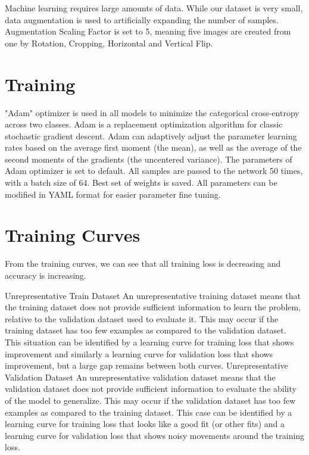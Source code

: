 Machine learning requires large amounts of data. While our dataset is very small, data augmentation is used to artificially expanding the number of samples. Augmentation Scaling Factor is set to 5, meaning five images are created from one by Rotation, Cropping, Horizontal and Vertical Flip.

\section{Training}
"Adam" optimizer is used in all models to minimize the categorical cross-entropy across two classes. Adam is a replacement optimization algorithm for classic stochastic gradient descent. Adam can adaptively adjust the parameter learning rates based on the average first moment (the mean), as well as the average of the second moments of the gradients (the uncentered variance). The parameters of Adam optimizer is set to default. All samples are passed to the network 50 times, with a batch size of 64. Best set of weights is saved. All parameters can be modified in YAML format for easier parameter fine tuning.


\section{Training Curves}

From the training curves, we can see that all training loss is decreasing and accuracy is increasing.

Unrepresentative Train Dataset
An unrepresentative training dataset means that the training dataset does not provide sufficient information to learn the problem, relative to the validation dataset used to evaluate it.
This may occur if the training dataset has too few examples as compared to the validation dataset.
This situation can be identified by a learning curve for training loss that shows improvement and similarly a learning curve for validation loss that shows improvement, but a large gap remains between both curves.
Unrepresentative Validation Dataset
An unrepresentative validation dataset means that the validation dataset does not provide sufficient information to evaluate the ability of the model to generalize.
This may occur if the validation dataset has too few examples as compared to the training dataset.
This case can be identified by a learning curve for training loss that looks like a good fit (or other fits) and a learning curve for validation loss that shows noisy movements around the training loss.


